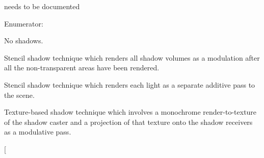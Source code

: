 needs to be documented 

\begin{Desc}
\item[Enumerator: ]\par
\begin{description}
\item[{\em 
\hypertarget{classphys_1_1SceneManager_a427f1bbb52c11ad07352ae01d8b3c746ad96e23ac363ae9de73e2d3816ae66f2e}{
SST\_\-None}
\label{classphys_1_1SceneManager_a427f1bbb52c11ad07352ae01d8b3c746ad96e23ac363ae9de73e2d3816ae66f2e}
}]No shadows. \item[{\em 
\hypertarget{classphys_1_1SceneManager_a427f1bbb52c11ad07352ae01d8b3c746a9b11aebab7ffc5ff359f5a49b4ff5e7d}{
SST\_\-Stencil\_\-Modulative}
\label{classphys_1_1SceneManager_a427f1bbb52c11ad07352ae01d8b3c746a9b11aebab7ffc5ff359f5a49b4ff5e7d}
}]Stencil shadow technique which renders all shadow volumes as a modulation after all the non-\/transparent areas have been rendered. \item[{\em 
\hypertarget{classphys_1_1SceneManager_a427f1bbb52c11ad07352ae01d8b3c746a17ba96aa6b125ac6c787851815370d97}{
SST\_\-Stencil\_\-Additive}
\label{classphys_1_1SceneManager_a427f1bbb52c11ad07352ae01d8b3c746a17ba96aa6b125ac6c787851815370d97}
}]Stencil shadow technique which renders each light as a separate additive pass to the scene. \item[{\em 
\hypertarget{classphys_1_1SceneManager_a427f1bbb52c11ad07352ae01d8b3c746a6ce2d2624df59f6c2fb6f3cb07d3adf8}{
SST\_\-Texture\_\-Modulative}
\label{classphys_1_1SceneManager_a427f1bbb52c11ad07352ae01d8b3c746a6ce2d2624df59f6c2fb6f3cb07d3adf8}
}]Texture-\/based shadow technique which involves a monochrome render-\/to-\/texture of the shadow caster and a projection of that texture onto the shadow receivers as a modulative pass. \item[{\em 
}
\end{description}
\end{Desc}
